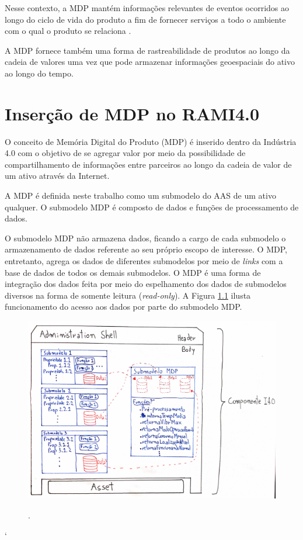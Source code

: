 \documentclass[
	12pt,				%
	oneside,			%
	a4paper,			%
	english,			%
	brazil				%
]{abntex2}
\begin{document}
	Nesse contexto, a MDP mantém informações relevantes de eventos ocorridos ao longo do ciclo de vida do produto a fim de fornecer serviços a todo o ambiente com o qual o produto se relaciona \cite{brandherm2011productmemory}.
	
	A MDP fornece também uma forma de rastreabilidade de produtos ao longo da cadeia de valores uma vez que pode armazenar informações geoespaciais do ativo ao longo do tempo.



\chapter{Inserção de MDP no RAMI4.0}

	O conceito de Memória Digital do Produto (MDP) é inserido dentro da Indústria 4.0 com o objetivo de se agregar valor por meio da possibilidade de compartilhamento de informações entre parceiros ao longo da cadeia de valor de um ativo através da Internet.
	
	A MDP é definida neste trabalho como um submodelo do AAS de um ativo qualquer. O submodelo MDP é composto de dados e funções de processamento de dados.
	
	O submodelo MDP não armazena dados, ficando a cargo de cada submodelo o armazenamento de dados referente ao seu próprio escopo de interesse. O MDP, entretanto, agrega os dados de diferentes submodelos por meio de \textit{links} com a base de dados de todos os demais submodelos. O MDP é uma forma de integração dos dados feita por meio do espelhamento dos dados de submodelos diversos na forma de somente leitura (\textit{read-only}). A Figura \ref{fig:submodeloMDP} ilusta funcionamento do acesso aos dados por parte do submodelo MDP.
	
	\begin{figure}[H]
		\centering
		\caption{.}
		\includegraphics[width=1\textwidth]{submodeloMDP.png}
		\label{fig:submodeloMDP}
	\end{figure}`
\end{document}
